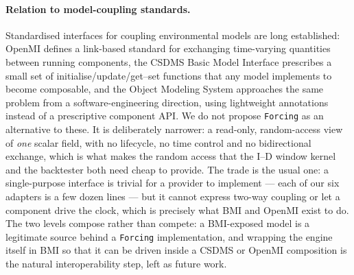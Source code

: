 \documentclass[authoryear,preprint,review,12pt]{elsarticle}
\begin{document}
\paragraph{Relation to model-coupling standards.}
Standardised interfaces for coupling environmental models are long established:
OpenMI \citep{gregersen2007} defines a link-based standard for exchanging
time-varying quantities between running components, the CSDMS Basic Model
Interface \citep{peckham2013,hutton2020} prescribes a small set of
initialise/update/get--set functions that any model implements to become
composable, and the Object Modeling System \citep{david2013} approaches the same
problem from a software-engineering direction, using lightweight annotations
instead of a prescriptive component API. We do not propose \texttt{Forcing} as an
alternative to these. It is deliberately narrower: a read-only, random-access view
of \emph{one} scalar field, with no lifecycle, no time control and no
bidirectional exchange, which is what makes the random access that the I--D window
kernel and the backtester both need cheap to provide. The trade is the usual one:
a single-purpose interface is trivial for a provider to implement --- each of our
six adapters is a few dozen lines --- but it cannot express two-way coupling or
let a component drive the clock, which is precisely what BMI and OpenMI exist to
do. The two levels compose rather than compete: a BMI-exposed model is a
legitimate source behind a \texttt{Forcing} implementation, and wrapping the
engine itself in BMI so that it can be driven inside a CSDMS or OpenMI
composition is the natural interoperability step, left as future work.
\end{document}
